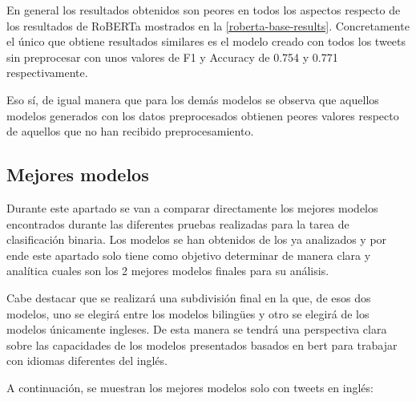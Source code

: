 En general los resultados obtenidos son peores en todos los aspectos respecto de los resultados de RoBERTa mostrados en la \autoref{roberta-base-results}. Concretamente el único que obtiene resultados similares es el modelo creado con todos los tweets sin preprocesar con unos valores de F1 y Accuracy de 0.754 y 0.771 respectivamente. 

Eso sí, de igual manera que para los demás modelos se observa que aquellos modelos generados con los datos preprocesados obtienen peores valores respecto de aquellos que no han recibido preprocesamiento.

\subsection{Mejores modelos}

Durante este apartado se van a comparar directamente los mejores modelos encontrados durante las diferentes pruebas realizadas para la tarea de clasificación binaria. Los modelos se han obtenidos de los ya analizados y por ende este apartado solo tiene como objetivo determinar de manera clara y analítica cuales son los 2 mejores modelos finales para su análisis. 

Cabe destacar que se realizará una subdivisión final en la que, de esos dos modelos, uno se elegirá entre los modelos bilingües y otro se elegirá de los modelos únicamente ingleses. De esta manera se tendrá una perspectiva clara sobre las capacidades de los modelos presentados basados en bert para trabajar con idiomas diferentes del inglés.

A continuación, se muestran los mejores modelos solo con tweets en inglés:

